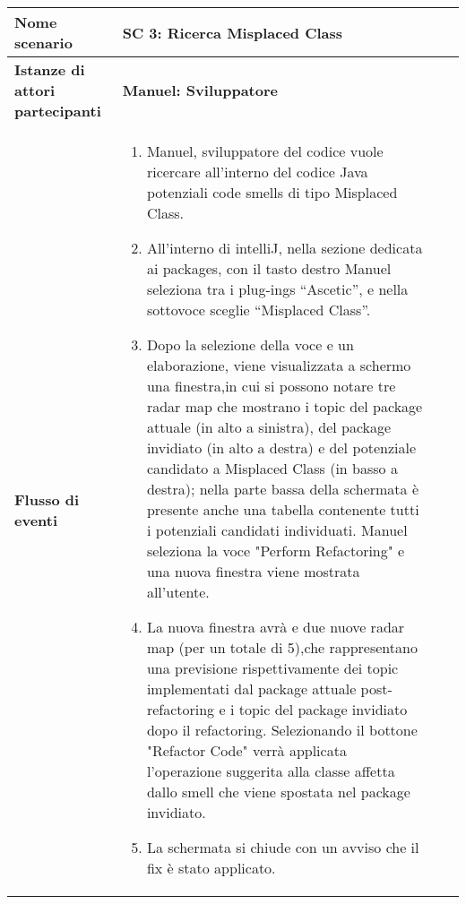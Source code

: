 	\vspace{0.5cm}
		
	\begin{tabular}{|l|p{8cm}|p{1cm}|p{1.1cm}|}
		\hline
		\textbf{Nome scenario}  & \textbf{SC 3: Ricerca Misplaced Class} \\ \hline
		\textbf{Istanze di attori partecipanti}  & \textbf{Manuel: Sviluppatore} \\ \hline
		\textbf{Flusso di eventi}  & \begin{enumerate}
		\item Manuel, sviluppatore del codice vuole ricercare all’interno del codice Java potenziali code smells di tipo Misplaced Class. 
		\item All’interno di intelliJ, nella sezione dedicata ai packages, con il tasto destro Manuel seleziona tra i plug-ings “Ascetic”, e nella sottovoce sceglie “Misplaced Class”. 
		\item Dopo la selezione della voce e un elaborazione, viene visualizzata a schermo una finestra,in cui si possono notare tre radar map che mostrano i topic del package attuale (in alto a sinistra), del package invidiato (in alto a destra) e del potenziale candidato a Misplaced Class (in basso a destra); nella parte bassa della schermata è presente anche una tabella contenente tutti i potenziali candidati individuati. Manuel seleziona la voce "Perform Refactoring" e una nuova finestra viene mostrata all’utente.
		\item  La nuova finestra avrà e due nuove radar map (per un totale di 5),che rappresentano una previsione rispettivamente dei topic implementati dal package attuale post-refactoring e i topic del package invidiato dopo il refactoring. Selezionando il bottone "Refactor Code" verrà applicata l’operazione suggerita alla classe affetta dallo smell che viene spostata nel package invidiato.
		\item La schermata si chiude con un avviso che il fix è stato applicato.
		\end{enumerate} \\ \hline
	\end{tabular}
	\vspace{0.5cm}
		

